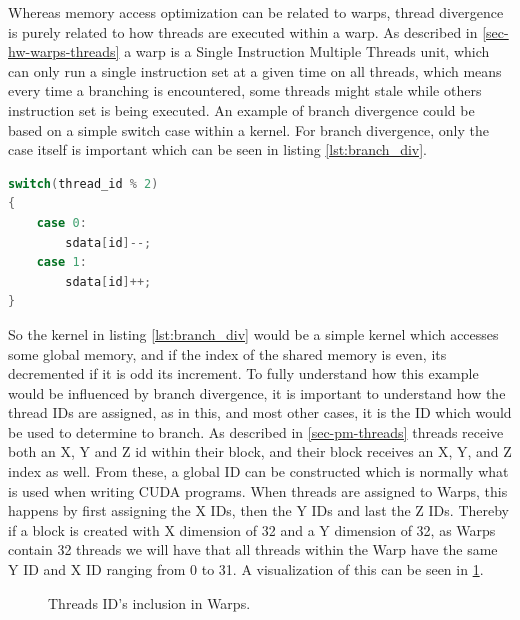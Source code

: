 Whereas memory access optimization can be related to warps, thread divergence is purely related to how threads are executed within a warp. As described in \cref{sec-hw-warps-threads} a warp is a Single Instruction Multiple Threads unit, which can only run a single instruction set at a given time on all threads, which means every time a branching is encountered, some threads might stale while others instruction set is being executed. An example of branch divergence could be based on a simple switch case within a kernel. For branch divergence, only the case itself is important which can be seen in listing \ref{lst:branch_div}.\\

\begin{lstlisting}[language=C,caption={Dividing threads into warps, using modulus operator},label=lst:branch_div]
switch(thread_id % 2)
{
	case 0:
		sdata[id]--;
	case 1:
		sdata[id]++;
}
\end{lstlisting} 

So the kernel in listing \ref{lst:branch_div} would be a simple kernel which accesses some global memory, and if the index of the shared memory is even, its decremented if it is odd its increment. To fully understand how this example would be influenced by branch divergence, it is important to understand how the thread IDs are assigned, as in this, and most other cases, it is the ID which would be used to determine to branch. As described in \cref{sec-pm-threads} threads receive both an X, Y and Z id within their block, and their block receives an X, Y, and Z index as well. From these, a global ID can be constructed which is normally what is used when writing CUDA programs. When threads are assigned to Warps, this happens by first assigning the X IDs, then the Y IDs and last the Z IDs. Thereby if a block is created with X dimension of 32 and a Y dimension of 32, as Warps contain 32 threads we will have that all threads within the Warp have the same Y ID and X ID ranging from 0 to 31. A visualization of this can be seen in \cref{fig:id_warp}.\\

\begin{figure}[ht]
	\centering
	\caption{Threads ID's inclusion in Warps.}
	\label{fig:id_warp}
\end{figure}

